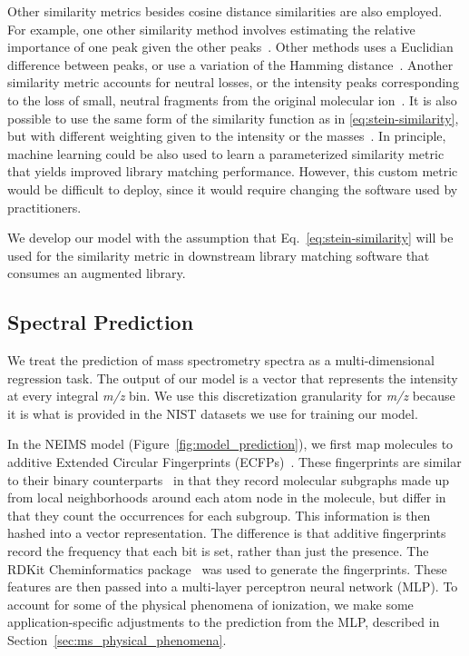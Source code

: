 \documentclass{article}
\begin{document}
Other similarity metrics besides cosine distance similarities are also employed. For example, one other similarity method involves estimating the relative importance of one peak given the other peaks~\cite{mclafferty1974probability}. Other methods uses a Euclidian difference between peaks, or use a variation of the Hamming distance~\cite{stein1994optimization,hertz1971identification}. Another similarity metric accounts for neutral losses, or the intensity peaks corresponding to the loss of small, neutral fragments from the original molecular ion~\cite{moorthy2017combining}. It is also possible to use the same form of the similarity function as in \eqref{eq:stein-similarity}, but with different weighting given to the intensity or the masses~\cite{stein1994optimization}. In principle, machine learning could be also used to learn a parameterized similarity metric that yields improved library matching performance. However, this custom metric would be difficult to deploy, since it would require changing the software used by practitioners. 

We develop our model with the assumption that Eq.~\eqref{eq:stein-similarity} will be used for the similarity metric in downstream library matching software that consumes an augmented library.

\subsection{Spectral Prediction}\label{sec:ms_spectral_prediction}

We treat the prediction of mass spectrometry spectra as a multi-dimensional regression task. The output of our model is a vector that represents the intensity at every integral \textit{m/z} bin. We use this discretization granularity for \textit{m/z} because it is what is provided in the NIST datasets we use for training our model.

In the NEIMS model (Figure~\ref{fig:model_prediction}), we first map molecules to additive Extended Circular Fingerprints (ECFPs)~\cite{rdkit}.  
These fingerprints are similar to their binary counterparts~\cite{Rogers_2010_ECFP} in that they record molecular subgraphs made up from local neighborhoods around each atom node in the molecule, but differ in that they count the occurrences for each subgroup. This information is then hashed into a vector representation. The difference is that additive fingerprints record the frequency that each bit is set, rather than just the presence. The RDKit Cheminformatics package~\cite{rdkit} was used to generate the fingerprints.
These features are then passed into a multi-layer perceptron neural network (MLP). 
To account for some of the physical phenomena of ionization, we make some application-specific adjustments to the prediction from the MLP, described in Section~\ref{sec:ms_physical_phenomena}.
\end{document}
